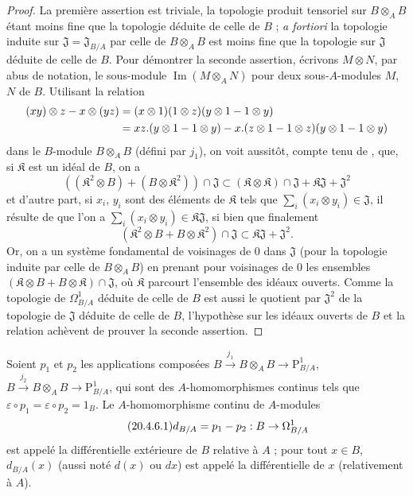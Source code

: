 \begin{proof}
La première assertion est triviale, la topologie produit tensoriel sur
$B\otimes_A B$ étant moins fine que la topologie déduite de celle de $B$ ;
\emph{a fortiori} la topologie induite sur
$\mathfrak{J}=\mathfrak{J}_{B/A}$
par celle de $B\otimes_A B$ est moins fine que la topologie sur $\mathfrak{J}$
déduite de celle de $B$. Pour démontrer la seconde assertion, écrivons
$M\otimes N$, par abus de notation, le sous-module
$\operatorname{Im}(M\otimes_A N)$ pour deux sous-$A$-modules $M$, $N$ de $B$.
Utilisant la relation
\[
\begin{aligned}
  (xy)\otimes z- x\otimes(yz)
  &=(x\otimes1)(1\otimes z)(y\otimes1- 1\otimes y)\\
  &=xz.(y\otimes1- 1\otimes y)
    - x.(z\otimes1- 1\otimes z)(y\otimes1- 1\otimes y)
\end{aligned}
\]
dans le $B$-module $B\otimes_A B$ (défini par $j_1$), on voit aussitôt,
compte tenu de , que, si $\mathfrak{K}$ est un idéal de
$B$, on a
\[
  ((\mathfrak{K}^2\otimes B)+(B\otimes\mathfrak{K}^2))\cap\mathfrak{J}
  \subset(\mathfrak{K}\otimes\mathfrak{K})\cap\mathfrak{J}
  +\mathfrak{K}\mathfrak{J}+\mathfrak{J}^2
\]
et d'autre part, si $x_i$, $y_i$ sont des éléments de $\mathfrak{K}$ tels
que $\sum_i(x_i\otimes y_i)\in\mathfrak{J}$, il résulte de
 que l'on a
$\sum_i(x_i\otimes y_i)\in\mathfrak{K}\mathfrak{J}$, si bien que finalement
\begin{equation}
\tag{20.4.5.1}
\label{0.20.4.5.1-fr}
  (\mathfrak{K}^2\otimes B+B\otimes\mathfrak{K}^2)\cap\mathfrak{J}
  \subset\mathfrak{K}\mathfrak{J}+\mathfrak{J}^2.
\end{equation}
Or, on a un système fondamental de voisinages de $0$ dans $\mathfrak{J}$
(pour la topologie induite par celle de $B\otimes_A B$) en prenant pour
voisinages de $0$ les ensembles
$(\mathfrak{K}\otimes B+B\otimes\mathfrak{K})\cap\mathfrak{J}$, où
$\mathfrak{K}$ parcourt l'ensemble des idéaux ouverts. Comme la topologie de
$\Omega^1_{B/A}$ déduite de celle de $B$ est aussi le quotient par
$\mathfrak{J}^2$ de la topologie de $\mathfrak{J}$ déduite de celle de $B$,
l'hypothèse sur les idéaux ouverts de $B$ et la relation
 achèvent de prouver la seconde assertion.
\end{proof}

\begin{definition}[20.4.6]
\label{0.20.4.6-fr}
Soient $p_1$ et $p_2$ les applications composées
$B\xrightarrow{j_1}B\otimes_A B\to\mathrm{P}^1_{B/A}$,
$B\xrightarrow{j_2}B\otimes_A B\to\mathrm{P}^1_{B/A}$, qui sont des
$A$-homomorphismes continus tels que
$\varepsilon\circ p_1=\varepsilon\circ p_2=1_B$. Le
$A$-homomorphisme continu de $A$-modules
\begin{equation}
\tag{20.4.6.1}
\label{0.20.4.6.1-fr}
  d_{B/A}=p_1- p_2:B\to\Omega^1_{B/A}
\end{equation}
est appelé la différentielle extérieure de $B$ relative à $A$ ; pour
tout $x\in B$, $d_{B/A}(x)$ (aussi noté $d(x)$ ou $dx$) est appelé la
différentielle de $x$ (relativement à $A$).
\end{definition}


